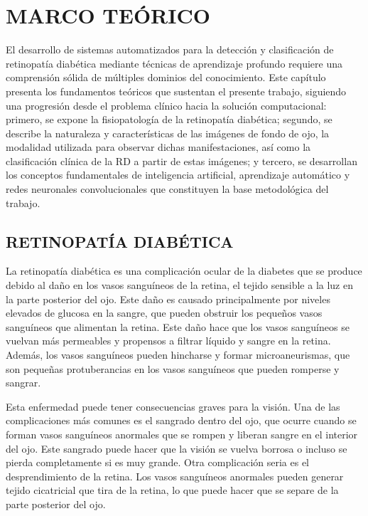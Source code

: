 \chapter{MARCO TEÓRICO} \label{chap:fundamentos}

El desarrollo de sistemas automatizados para la detección y clasificación de retinopatía
diabética mediante técnicas de aprendizaje profundo requiere una comprensión sólida de
múltiples dominios del conocimiento. Este capítulo presenta los fundamentos teóricos que
sustentan el presente trabajo, siguiendo una progresión desde el problema clínico hacia
la solución computacional: primero, se expone la fisiopatología de la retinopatía
diabética; segundo, se describe la naturaleza y características de las imágenes de fondo
de ojo, la modalidad utilizada para observar dichas manifestaciones, así como la
clasificación clínica de la RD a partir de estas imágenes; y tercero, se desarrollan los
conceptos fundamentales de inteligencia artificial, aprendizaje automático y redes
neuronales convolucionales que constituyen la base metodológica del trabajo.


\section{RETINOPATÍA DIABÉTICA}

La retinopatía diabética es una complicación ocular de la diabetes que se produce debido
al daño en los vasos sanguíneos de la retina, el tejido sensible a la luz en la parte
posterior del ojo. Este daño es causado principalmente por niveles elevados de glucosa en
la sangre, que pueden obstruir los pequeños vasos sanguíneos que alimentan la retina.
Este daño hace que los vasos sanguíneos se vuelvan más permeables y propensos a filtrar
líquido y sangre en la retina. Además, los vasos sanguíneos pueden hincharse y formar
microaneurismas, que son pequeñas protuberancias en los vasos sanguíneos que pueden
romperse y sangrar.

Esta enfermedad puede tener consecuencias graves para la visión. Una de las
complicaciones más comunes es el sangrado dentro del ojo, que ocurre cuando se forman
vasos sanguíneos anormales que se rompen y liberan sangre en el interior del ojo. Este
sangrado puede hacer que la visión se vuelva borrosa o incluso se pierda completamente si
es muy grande. Otra complicación seria es el desprendimiento de la retina. Los vasos
sanguíneos anormales pueden generar tejido cicatricial que tira de la retina, lo que
puede hacer que se separe de la parte posterior del ojo.

